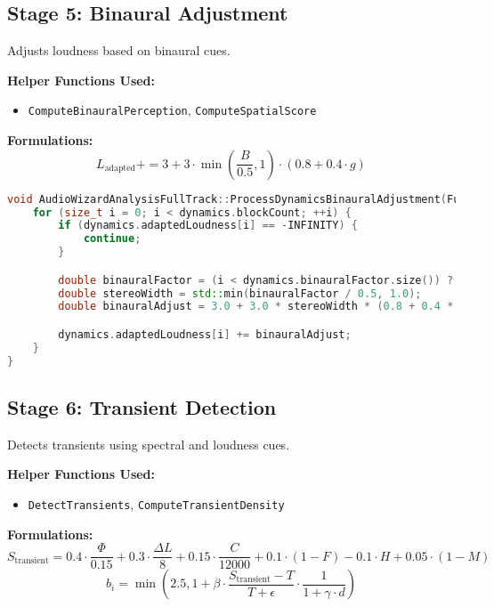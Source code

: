 \documentclass[11pt]{article}
\begin{document}
\subsection{Stage 5: Binaural Adjustment}
Adjusts loudness based on binaural cues.

\textbf{Helper Functions Used:}
\begin{itemize}
  \item \texttt{ComputeBinauralPerception}, \texttt{ComputeSpatialScore}
\end{itemize}

\textbf{Formulations:}
\begin{equation}
L_{\text{adapted}} += 3 + 3 \cdot \min\left(\frac{B}{0.5}, 1\right) \cdot (0.8 + 0.4 \cdot g)
\end{equation}

\begin{lstlisting}[language=C++]
void AudioWizardAnalysisFullTrack::ProcessDynamicsBinauralAdjustment(FullTrackDataDynamics& dynamics) {
	for (size_t i = 0; i < dynamics.blockCount; ++i) {
		if (dynamics.adaptedLoudness[i] == -INFINITY) {
			continue;
		}

		double binauralFactor = (i < dynamics.binauralFactor.size()) ? dynamics.binauralFactor[i] : 1.0;
		double stereoWidth = std::min(binauralFactor / 0.5, 1.0);
		double binauralAdjust = 3.0 + 3.0 * stereoWidth * (0.8 + 0.4 * dynamics.genreFactor);

		dynamics.adaptedLoudness[i] += binauralAdjust;
	}
}
\end{lstlisting}

\subsection{Stage 6: Transient Detection}
Detects transients using spectral and loudness cues.

\textbf{Helper Functions Used:}
\begin{itemize}
  \item \texttt{DetectTransients}, \texttt{ComputeTransientDensity}
\end{itemize}

\textbf{Formulations:}
\begin{equation}
S_{\text{transient}} = 0.4 \cdot \frac{\Phi}{0.15} + 0.3 \cdot \frac{\Delta L}{8} + 0.15 \cdot \frac{C}{12000} + 0.1 \cdot (1 - F) - 0.1 \cdot H + 0.05 \cdot (1 - M)
\end{equation}
\begin{equation}
b_i = \min\left(2.5, 1 + \beta \cdot \frac{S_{\text{transient}} - T}{T + \epsilon} \cdot \frac{1}{1 + \gamma \cdot d}\right)
\end{equation}
\end{document}
